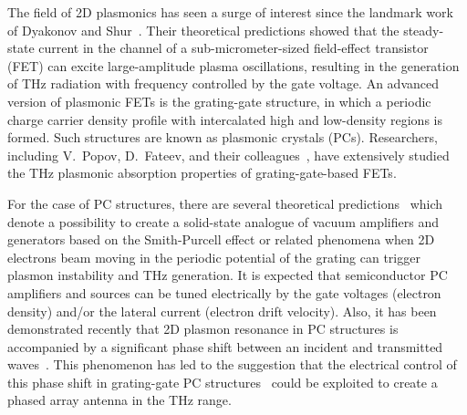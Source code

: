 \documentclass[%
 reprint,
 amsmath,amssymb,
 aps,
]{revtex4-2}
\begin{document}

The field of 2D plasmonics has seen a surge of interest since the landmark work of Dyakonov and Shur~\cite{dyakonov1993}. Their theoretical predictions showed that the steady-state current in the channel of a sub-micrometer-sized field-effect transistor (FET) can excite large-amplitude plasma oscillations, resulting in the generation of THz radiation with frequency controlled by the gate voltage. An advanced version of plasmonic FETs is the grating-gate structure, in which a periodic charge carrier density profile with intercalated high and low-density regions is formed. Such structures are known as plasmonic crystals (PCs). Researchers, including V.~Popov, D.~Fateev, and their colleagues~\cite{Popov2010, Popov2011, Popov1993}, have extensively studied the THz plasmonic absorption properties of grating-gate-based FETs.

For the case of PC structures, there are several theoretical predictions~\cite{watanabe2013gain, takatsuka2012gain, boubanga2012ultrafast} which denote a possibility to create a solid-state analogue of vacuum amplifiers and generators based on the Smith-Purcell effect or related phenomena when 2D electrons beam moving in the periodic potential of the grating can trigger plasmon instability and THz generation. It is expected that semiconductor PC amplifiers and sources can be tuned electrically by the gate voltages (electron density) and/or the lateral current (electron drift velocity).
Also, it has been demonstrated recently that 2D plasmon resonance in PC structures is accompanied by a significant phase shift between an incident and transmitted waves~\cite{Pashnev2020}. This phenomenon has led to the suggestion that the electrical control of this phase shift in grating-gate PC structures~\cite{Kor2022} could be exploited to create a phased array antenna in the THz range.
\end{document}

